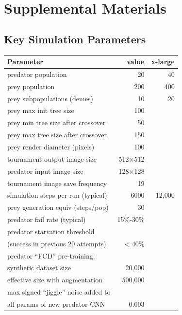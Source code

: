 \documentclass[acmtog]{acmart}
\begin{document}
\section{Supplemental Materials}
\subsection{Key Simulation Parameters}

\begin{table}[H]
\begin{adjustwidth}{1cm}{0cm}
\begin{tabular}{ |l|r|r| }
\hline
\textbf{Parameter} & \textbf{value} & \textbf{x-large} \\ 
\hline
predator population & 20 & 40 \\ 
prey population & 200 & 400 \\ 
prey subpopulations (demes) & 10 & 20 \\
prey max init tree size & 100 & \\
prey min tree size after crossover & 50 & \\
prey max tree size after crossover & 150 & \\
\hline
prey render diameter (pixels) & 100 & \\ 
tournament output image size & 512×512 & \\ 
predator input image size & 128×128 & \\ 
\hline
tournament image save frequency & 19 & \\
simulation steps per run (typical) & 6000 & 12,000 \\
prey generation equiv (steps/pop) & 30 & \\
predator fail rate (typical) & 15\%-30\% & \\
predator starvation threshold & & \\
\hspace{0.2cm}(success in previous 20 attempts) & < 40\% & \\ 
\hline
predator “FCD” pre-training: & & \\
\hspace{0.2cm} synthetic dataset size & 20,000 & \\
\hspace{0.2cm} effective size with augmentation & 500,000 & \\
\hline
max signed “jiggle” noise added to  & & \\
\hspace{0.2cm} all params of new predator CNN & 0.003 & \\
\hline
\end{tabular}
\end{adjustwidth}
\label{table:1}
\end{table}
\end{document}

